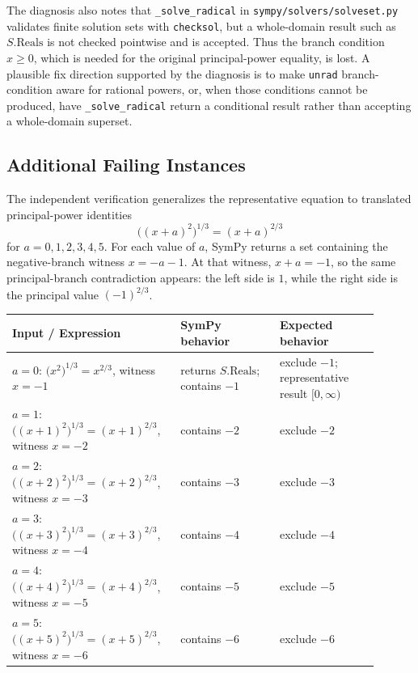 \documentclass[11pt]{article}
\begin{document}
The diagnosis also notes that \texttt{\_solve\_radical} in \nolinkurl{sympy/solvers/solveset.py} validates finite solution sets with \texttt{checksol}, but a whole-domain result such as \(S.\mathrm{Reals}\) is not checked pointwise and is accepted.  Thus the branch condition \(x\ge 0\), which is needed for the original principal-power equality, is lost.  A plausible fix direction supported by the diagnosis is to make \texttt{unrad} branch-condition aware for rational powers, or, when those conditions cannot be produced, have \texttt{\_solve\_radical} return a conditional result rather than accepting a whole-domain superset.

\subsection{Additional Failing Instances}

The independent verification generalizes the representative equation to translated principal-power identities
\[
  \bigl((x+a)^2\bigr)^{1/3}=(x+a)^{2/3}
\]
for \(a=0,1,2,3,4,5\).  For each value of \(a\), SymPy returns a set containing the negative-branch witness \(x=-a-1\).  At that witness, \(x+a=-1\), so the same principal-branch contradiction appears: the left side is \(1\), while the right side is the principal value \((-1)^{2/3}\).

\begin{center}
\small
\renewcommand{\arraystretch}{1.3}
\begin{tabular}{@{}>{\raggedright\arraybackslash}p{0.40\linewidth}>{\raggedright\arraybackslash}p{0.25\linewidth}>{\raggedright\arraybackslash}p{0.25\linewidth}@{}}
\toprule
\textbf{Input / Expression} & \textbf{SymPy behavior} & \textbf{Expected behavior} \\
\midrule
\(a=0\): \(\bigl(x^2\bigr)^{1/3}=x^{2/3}\), witness \(x=-1\) & returns \(S.\mathrm{Reals}\); contains \(-1\) & exclude \(-1\); representative result \([0,\infty)\) \\
\(a=1\): \(\bigl((x+1)^2\bigr)^{1/3}=(x+1)^{2/3}\), witness \(x=-2\) & contains \(-2\) & exclude \(-2\) \\
\(a=2\): \(\bigl((x+2)^2\bigr)^{1/3}=(x+2)^{2/3}\), witness \(x=-3\) & contains \(-3\) & exclude \(-3\) \\
\(a=3\): \(\bigl((x+3)^2\bigr)^{1/3}=(x+3)^{2/3}\), witness \(x=-4\) & contains \(-4\) & exclude \(-4\) \\
\(a=4\): \(\bigl((x+4)^2\bigr)^{1/3}=(x+4)^{2/3}\), witness \(x=-5\) & contains \(-5\) & exclude \(-5\) \\
\(a=5\): \(\bigl((x+5)^2\bigr)^{1/3}=(x+5)^{2/3}\), witness \(x=-6\) & contains \(-6\) & exclude \(-6\) \\
\bottomrule
\end{tabular}
\end{center}
\end{document}
